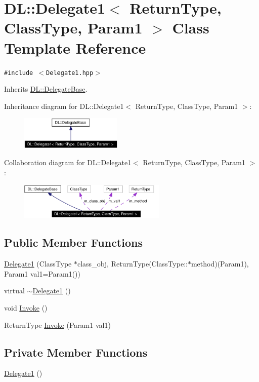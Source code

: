 \hypertarget{classDL_1_1Delegate1}{
\section{DL::Delegate1$<$ Return\-Type, Class\-Type, Param1 $>$ Class Template Reference}
\label{classDL_1_1Delegate1}
}
{\tt \#include $<$Delegate1.hpp$>$}

Inherits \hyperlink{classDL_1_1DelegateBase}{DL::Delegate\-Base}.

Inheritance diagram for DL::Delegate1$<$ Return\-Type, Class\-Type, Param1 $>$:\begin{figure}[H]
\begin{center}
\leavevmode
\includegraphics[width=138pt]{classDL_1_1Delegate1__inherit__graph}
\end{center}
\end{figure}
Collaboration diagram for DL::Delegate1$<$ Return\-Type, Class\-Type, Param1 $>$:\begin{figure}[H]
\begin{center}
\leavevmode
\includegraphics[width=200pt]{classDL_1_1Delegate1__coll__graph}
\end{center}
\end{figure}
\subsection*{Public Member Functions}
\begin{CompactItemize}
\item 
\hyperlink{classDL_1_1Delegate1_a0}{Delegate1} (Class\-Type $\ast$class\_\-obj, Return\-Type(Class\-Type::$\ast$method)(Param1), Param1 val1=Param1())
\item 
virtual \hyperlink{classDL_1_1Delegate1_a1}{$\sim$Delegate1} ()
\item 
void \hyperlink{classDL_1_1Delegate1_a2}{Invoke} ()
\item 
Return\-Type \hyperlink{classDL_1_1Delegate1_a3}{Invoke} (Param1 val1)
\end{CompactItemize}
\subsection*{Private Member Functions}
\begin{CompactItemize}
\item 
\hyperlink{classDL_1_1Delegate1_d0}{Delegate1} ()
\end{CompactItemize}
